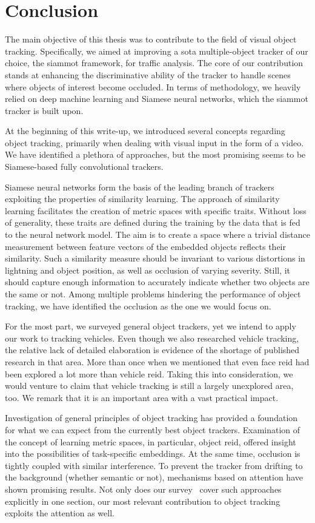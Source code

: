 \section{Conclusion}
\label{sec:Conclusion}

The main objective of this thesis was to contribute to the field of visual object tracking. Specifically, we aimed at improving a \gls{sota} multiple-object tracker of our choice, the \gls{siammot} framework, for traffic analysis. The core of our contribution stands at enhancing the discriminative ability of the tracker to handle scenes where objects of interest become occluded. In terms of methodology, we heavily relied on deep machine learning and Siamese neural networks, which the \gls{siammot} tracker is built upon.

At the beginning of this write-up, we introduced several concepts regarding object tracking, primarily when dealing with visual input in the form of a video. We have identified a plethora of approaches, but the most promising seems to be Siamese-based fully convolutional trackers.

Siamese neural networks form the basis of the leading branch of trackers exploiting the properties of similarity learning. The approach of similarity learning facilitates the creation of metric spaces with specific traits. Without loss of generality, these traits are defined during the training by the data that is fed to the neural network model. The aim is to create a space where a trivial distance measurement between feature vectors of the embedded objects reflects their similarity. Such a similarity measure should be invariant to various distortions in lightning and object position, as well as occlusion of varying severity. Still, it should capture enough information to accurately indicate whether two objects are the same or not. Among multiple problems hindering the performance of object tracking, we have identified the occlusion as the one we would focus on.

For the most part, we surveyed general object trackers, yet we intend to apply our work to tracking vehicles. Even though we also researched vehicle tracking, the relative lack of detailed elaboration is evidence of the shortage of published research in that area. More than once when we mentioned that even face \gls{reid} had been explored a lot more than vehicle \gls{reid}. Taking this into consideration, we would venture to claim that vehicle tracking is still a largely unexplored area, too. We remark that it is an important area with a vast practical impact.

Investigation of general principles of object tracking has provided a foundation for what we can expect from the currently best object trackers. Examination of the concept of learning metric spaces, in particular, object \gls{reid}, offered insight into the possibilities of task-specific embeddings. At the same time, occlusion is tightly coupled with similar interference. To prevent the tracker from drifting to the background (whether semantic or not), mechanisms based on attention have shown promising results. Not only does our survey~\cite{ondrasovic2021siamese} cover such approaches explicitly in one section, our most relevant contribution to object tracking exploits the attention as well.
